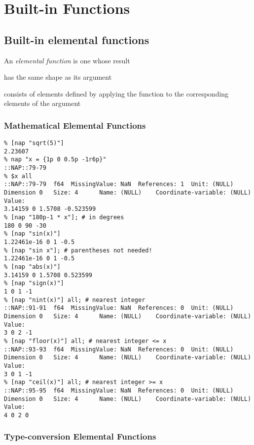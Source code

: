 
\section{Built-in Functions}

\subsection{Built-in elemental functions}

An 
  \emph{elemental function} is one whose result
\begin{bullets}
    \item has the same shape as its argument
    \item consists of elements defined by applying the function to the
    corresponding elements of the argument
\end{bullets}

\subsubsection{Mathematical Elemental Functions}

  \begin{verbatim}
% [nap "sqrt(5)"]
2.23607
% nap "x = {1p 0 0.5p -1r6p}"
::NAP::79-79
% $x all
::NAP::79-79  f64  MissingValue: NaN  References: 1  Unit: (NULL)
Dimension 0   Size: 4      Name: (NULL)    Coordinate-variable: (NULL)
Value:
3.14159 0 1.5708 -0.523599
% [nap "180p-1 * x"]; # in degrees
180 0 90 -30
% [nap "sin(x)"]
1.22461e-16 0 1 -0.5
% [nap "sin x"]; # parentheses not needed!
1.22461e-16 0 1 -0.5
% [nap "abs(x)"]
3.14159 0 1.5708 0.523599
% [nap "sign(x)"]
1 0 1 -1
% [nap "nint(x)"] all; # nearest integer
::NAP::91-91  f64  MissingValue: NaN  References: 0  Unit: (NULL)
Dimension 0   Size: 4      Name: (NULL)    Coordinate-variable: (NULL)
Value:
3 0 2 -1
% [nap "floor(x)"] all; # nearest integer <= x
::NAP::93-93  f64  MissingValue: NaN  References: 0  Unit: (NULL)
Dimension 0   Size: 4      Name: (NULL)    Coordinate-variable: (NULL)
Value:
3 0 1 -1
% [nap "ceil(x)"] all; # nearest integer >= x
::NAP::95-95  f64  MissingValue: NaN  References: 0  Unit: (NULL)
Dimension 0   Size: 4      Name: (NULL)    Coordinate-variable: (NULL)
Value:
4 0 2 0
\end{verbatim}

\subsubsection{Type-conversion Elemental Functions}

